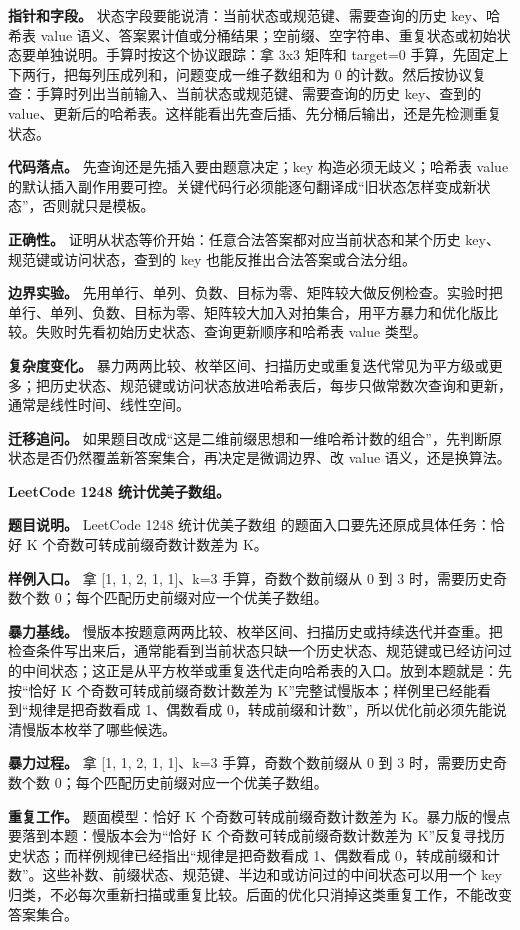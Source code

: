 \textbf{指针和字段。} 状态字段要能说清：当前状态或规范键、需要查询的历史 key、哈希表 value 语义、答案累计值或分桶结果；空前缀、空字符串、重复状态或初始状态要单独说明。手算时按这个协议跟踪：拿 3x3 矩阵和 target=0 手算，先固定上下两行，把每列压成列和，问题变成一维子数组和为 0 的计数。然后按协议复查：手算时列出当前输入、当前状态或规范键、需要查询的历史 key、查到的 value、更新后的哈希表。这样能看出先查后插、先分桶后输出，还是先检测重复状态。

\textbf{代码落点。} 先查询还是先插入要由题意决定；key 构造必须无歧义；哈希表 value 的默认插入副作用要可控。关键代码行必须能逐句翻译成“旧状态怎样变成新状态”，否则就只是模板。

\textbf{正确性。} 证明从状态等价开始：任意合法答案都对应当前状态和某个历史 key、规范键或访问状态，查到的 key 也能反推出合法答案或合法分组。

\textbf{边界实验。} 先用单行、单列、负数、目标为零、矩阵较大做反例检查。实验时把单行、单列、负数、目标为零、矩阵较大加入对拍集合，用平方暴力和优化版比较。失败时先看初始历史状态、查询更新顺序和哈希表 value 类型。

\textbf{复杂度变化。} 暴力两两比较、枚举区间、扫描历史或重复迭代常见为平方级或更多；把历史状态、规范键或访问状态放进哈希表后，每步只做常数次查询和更新，通常是线性时间、线性空间。

\textbf{迁移追问。} 如果题目改成“这是二维前缀思想和一维哈希计数的组合”，先判断原状态是否仍然覆盖新答案集合，再决定是微调边界、改 value 语义，还是换算法。

\noindent\textbf{LeetCode 1248 统计优美子数组。}

\textbf{题目说明。} LeetCode 1248 统计优美子数组 的题面入口要先还原成具体任务：恰好 K 个奇数可转成前缀奇数计数差为 K。

\textbf{样例入口。} 拿 [1, 1, 2, 1, 1]、k=3 手算，奇数个数前缀从 0 到 3 时，需要历史奇数个数 0；每个匹配历史前缀对应一个优美子数组。

\textbf{暴力基线。} 慢版本按题意两两比较、枚举区间、扫描历史或持续迭代并查重。把检查条件写出来后，通常能看到当前状态只缺一个历史状态、规范键或已经访问过的中间状态；这正是从平方枚举或重复迭代走向哈希表的入口。放到本题就是：先按“恰好 K 个奇数可转成前缀奇数计数差为 K”完整试慢版本；样例里已经能看到“规律是把奇数看成 1、偶数看成 0，转成前缀和计数”，所以优化前必须先能说清慢版本枚举了哪些候选。

\textbf{暴力过程。} 拿 [1, 1, 2, 1, 1]、k=3 手算，奇数个数前缀从 0 到 3 时，需要历史奇数个数 0；每个匹配历史前缀对应一个优美子数组。

\textbf{重复工作。} 题面模型：恰好 K 个奇数可转成前缀奇数计数差为 K。暴力版的慢点要落到本题：慢版本会为“恰好 K 个奇数可转成前缀奇数计数差为 K”反复寻找历史状态；而样例规律已经指出“规律是把奇数看成 1、偶数看成 0，转成前缀和计数”。这些补数、前缀状态、规范键、半边和或访问过的中间状态可以用一个 key 归类，不必每次重新扫描或重复比较。后面的优化只消掉这类重复工作，不能改变答案集合。

